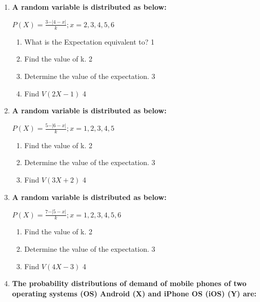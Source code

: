 \documentclass[a4paper,oneside]{book}
\begin{document}
\begin{enumerate}
        \item \textbf{A random variable is distributed as below:}
        
        \begin{center}
  $\displaystyle P(X) = \frac{3-\vert 4-x\vert}{k}; x=2,3,4,5,6$
  \end{center}

  \begin{enumerate}
    \item
	What is the Expectation equivalent to? \hfill 1
    \item
    	Find the value of k. \hfill 2
    \item
    	Determine the value of the expectation. \hfill 3
     \item
     	Find $V(2X-1)$ \hfill 4
  \end{enumerate}
  
  \item \textbf{A random variable is distributed as below:}

\begin{center}
  \textbf{$P(X) = \frac{5-\vert 6-x\vert}{k}; x=1,2,3,4,5$}
\end{center}

\begin{enumerate}
  \item
  	Find the value of k. \hfill 2
  \item
  	Determine the value of the expectation. \hfill 3
  \item
  	Find $V(3X+2)$ \hfill 4
\end{enumerate}

\item \textbf{A random variable is distributed as below:}

\begin{center}
  \textbf{$P(X) = \frac{7-\vert 5-x\vert}{k}; x=1,2,3,4,5,6$}
\end{center}

\begin{enumerate}
  \item
  	Find the value of k. \hfill 2
  \item
  	Determine the value of the expectation. \hfill 3
  \item
  	Find $V(4X-3)$ \hfill 4
\end{enumerate}

  
   \item
	  \textbf{The probability distributions of demand of mobile phones of two 
	  operating systems (OS) Android (X) and iPhone OS (iOS) (Y) are:} 
	  

\end{enumerate}
\end{document}
